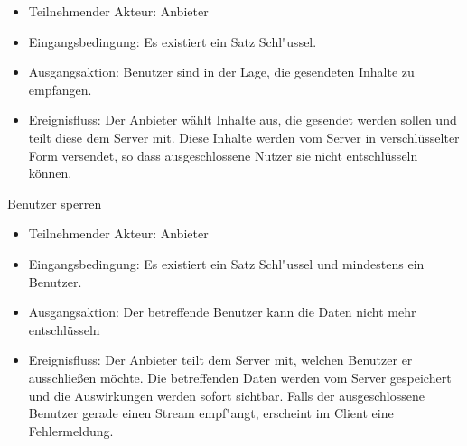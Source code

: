 \documentclass[a4paper,10pt]{scrartcl}
\begin{document}
\begin{usecase}
{\begin{itemize}
   \item Teilnehmender Akteur: Anbieter
   \item Eingangsbedingung: Es existiert ein Satz Schl"ussel.
   \item Ausgangsaktion: Benutzer sind in der Lage, die gesendeten Inhalte zu empfangen.
   \item Ereignisfluss: Der Anbieter wählt Inhalte aus, die gesendet werden sollen und
         teilt diese dem Server mit. Diese Inhalte werden vom Server in verschlüsselter Form
         versendet, so dass ausgeschlossene Nutzer sie nicht entschlüsseln können.
   \end{itemize}
}
 {Benutzer sperren
   \begin{itemize}
   \item Teilnehmender Akteur: Anbieter
   \item Eingangsbedingung: Es existiert ein Satz Schl"ussel und mindestens ein Benutzer.
   \item Ausgangsaktion: Der betreffende Benutzer kann die Daten nicht mehr entschlüsseln
   \item Ereignisfluss: Der Anbieter teilt dem Server mit, welchen Benutzer er ausschließen möchte.
         Die betreffenden Daten werden vom Server gespeichert und die Auswirkungen werden
         sofort sichtbar. Falls der ausgeschlossene Benutzer gerade einen Stream empf"angt,
         erscheint im Client eine Fehlermeldung.
   \end{itemize}
}
\end{usecase}
\clearpage
\end{document}
